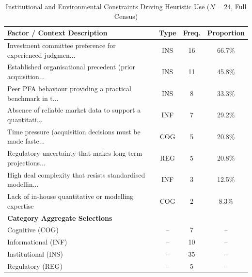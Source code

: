 \begin{table}[htbp]
\centering
\caption{Institutional and Environmental Constraints Driving Heuristic Use ($N=24$, Full Census)}
\label{tab:institutional_context_factors}
\begin{tabular}{lccc}
\hline
\textbf{Factor / Context Description} & \textbf{Type} & \textbf{Freq.} & \textbf{Proportion} \\
\hline
Investment committee preference for experienced judgmen... & INS & 16 & 66.7\% \\
Established organisational precedent (prior acquisition... & INS & 11 & 45.8\% \\
Peer PFA behaviour providing a practical benchmark in t... & INS & 8 & 33.3\% \\
Absence of reliable market data to support a quantitati... & INF & 7 & 29.2\% \\
Time pressure (acquisition decisions must be made faste... & COG & 5 & 20.8\% \\
Regulatory uncertainty that makes long-term projections... & REG & 5 & 20.8\% \\
High deal complexity that resists standardised modellin... & INF & 3 & 12.5\% \\
Lack of in-house quantitative or modelling expertise & COG & 2 & 8.3\% \\
\hline
\textbf{Category Aggregate Selections} & & & \\
Cognitive (COG) & -- & 7 & -- \\
Informational (INF) & -- & 10 & -- \\
Institutional (INS) & -- & 35 & -- \\
Regulatory (REG) & -- & 5 & -- \\
\hline
\end{tabular}
\end{table}

